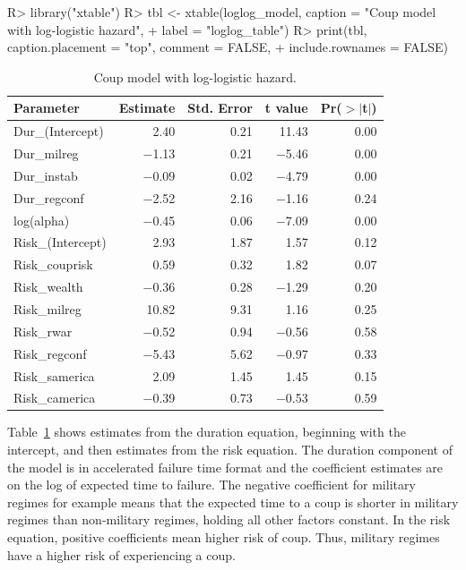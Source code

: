 \documentclass[article]{jss}
\begin{document}
\begin{CodeChunk}
\begin{CodeInput}
R> library("xtable")
R> tbl <- xtable(loglog_model, caption = "Coup model with log-logistic hazard",
+    label = "loglog_table")
R> print(tbl, caption.placement = "top", comment = FALSE, 
+    include.rownames = FALSE)
\end{CodeInput}
\end{CodeChunk}

\begin{table}[ht]
\centering
\begin{tabular}{lrrrr}
  \hline
Parameter & Estimate & Std. Error & t value & Pr($>$$|$t$|$) \\ 
  \hline
Dur\_(Intercept) & 2.40 & 0.21 & 11.43 & 0.00 \\ 
  Dur\_milreg & $-$1.13 & 0.21 & $-$5.46 & 0.00 \\ 
  Dur\_instab & $-$0.09 & 0.02 & $-$4.79 & 0.00 \\ 
  Dur\_regconf & $-$2.52 & 2.16 & $-$1.16 & 0.24 \\ 
  log(alpha) & $-$0.45 & 0.06 & $-$7.09 & 0.00 \\ 
  Risk\_(Intercept) & 2.93 & 1.87 & 1.57 & 0.12 \\ 
  Risk\_couprisk & 0.59 & 0.32 & 1.82 & 0.07 \\ 
  Risk\_wealth & $-$0.36 & 0.28 & $-$1.29 & 0.20 \\ 
  Risk\_milreg & 10.82 & 9.31 & 1.16 & 0.25 \\ 
  Risk\_rwar & $-$0.52 & 0.94 & $-$0.56 & 0.58 \\ 
  Risk\_regconf & $-$5.43 & 5.62 & $-$0.97 & 0.33 \\ 
  Risk\_samerica & 2.09 & 1.45 & 1.45 & 0.15 \\ 
  Risk\_camerica & $-$0.39 & 0.73 & $-$0.53 & 0.59 \\ 
   \hline
\end{tabular}
\caption{Coup model with log-logistic hazard.} 
\label{loglog_table}
\end{table}

Table~\ref{loglog_table} shows estimates from the duration equation,
beginning with the intercept, and then estimates from the risk equation.
The duration component of the model is in accelerated failure time
format and the coefficient estimates are on the log of expected time to
failure. The negative coefficient for military regimes for example means
that the expected time to a coup is shorter in military regimes than
non-military regimes, holding all other factors constant. In the risk
equation, positive coefficients mean higher risk of coup. Thus, military
regimes have a higher risk of experiencing a coup.
\end{document}
